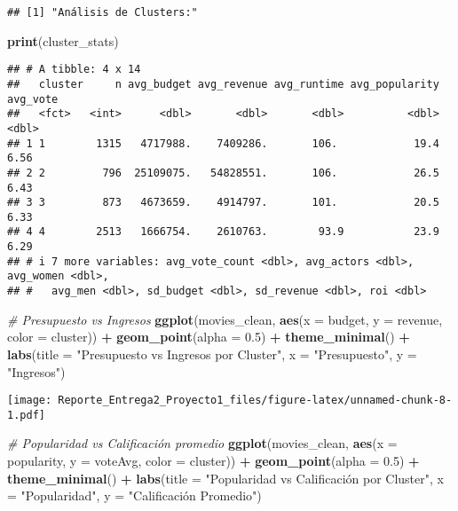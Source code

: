 \documentclass[
]{article}
\newenvironment{Shaded}{\begin{snugshade}}{\end{snugshade}}
\newcommand{\AttributeTok}[1]{\textcolor[rgb]{0.13,0.29,0.53}{#1}}
\newcommand{\CommentTok}[1]{\textcolor[rgb]{0.56,0.35,0.01}{\textit{#1}}}
\newcommand{\FloatTok}[1]{\textcolor[rgb]{0.00,0.00,0.81}{#1}}
\newcommand{\FunctionTok}[1]{\textcolor[rgb]{0.13,0.29,0.53}{\textbf{#1}}}
\newcommand{\NormalTok}[1]{#1}
\newcommand{\SpecialCharTok}[1]{\textcolor[rgb]{0.81,0.36,0.00}{\textbf{#1}}}
\newcommand{\StringTok}[1]{\textcolor[rgb]{0.31,0.60,0.02}{#1}}
\begin{document}
\begin{verbatim}
## [1] "Análisis de Clusters:"
\end{verbatim}

\begin{Shaded}
\begin{Highlighting}[]
\FunctionTok{print}\NormalTok{(cluster\_stats)}
\end{Highlighting}
\end{Shaded}

\begin{verbatim}
## # A tibble: 4 x 14
##   cluster     n avg_budget avg_revenue avg_runtime avg_popularity avg_vote
##   <fct>   <int>      <dbl>       <dbl>       <dbl>          <dbl>    <dbl>
## 1 1        1315   4717988.    7409286.       106.            19.4     6.56
## 2 2         796  25109075.   54828551.       106.            26.5     6.43
## 3 3         873   4673659.    4914797.       101.            20.5     6.33
## 4 4        2513   1666754.    2610763.        93.9           23.9     6.29
## # i 7 more variables: avg_vote_count <dbl>, avg_actors <dbl>, avg_women <dbl>,
## #   avg_men <dbl>, sd_budget <dbl>, sd_revenue <dbl>, roi <dbl>
\end{verbatim}

\begin{Shaded}
\begin{Highlighting}[]
\CommentTok{\# Presupuesto vs Ingresos}
\FunctionTok{ggplot}\NormalTok{(movies\_clean, }\FunctionTok{aes}\NormalTok{(}\AttributeTok{x =}\NormalTok{ budget, }\AttributeTok{y =}\NormalTok{ revenue, }\AttributeTok{color =}\NormalTok{ cluster)) }\SpecialCharTok{+}
  \FunctionTok{geom\_point}\NormalTok{(}\AttributeTok{alpha =} \FloatTok{0.5}\NormalTok{) }\SpecialCharTok{+}
  \FunctionTok{theme\_minimal}\NormalTok{() }\SpecialCharTok{+}
  \FunctionTok{labs}\NormalTok{(}\AttributeTok{title =} \StringTok{"Presupuesto vs Ingresos por Cluster"}\NormalTok{,}
       \AttributeTok{x =} \StringTok{"Presupuesto"}\NormalTok{,}
       \AttributeTok{y =} \StringTok{"Ingresos"}\NormalTok{)}
\end{Highlighting}
\end{Shaded}

\texttt{[image: Reporte\_Entrega2\_Proyecto1\_files/figure-latex/unnamed-chunk-8-1.pdf]}

\begin{Shaded}
\begin{Highlighting}[]
\CommentTok{\# Popularidad vs Calificación promedio}
\FunctionTok{ggplot}\NormalTok{(movies\_clean, }\FunctionTok{aes}\NormalTok{(}\AttributeTok{x =}\NormalTok{ popularity, }\AttributeTok{y =}\NormalTok{ voteAvg, }\AttributeTok{color =}\NormalTok{ cluster)) }\SpecialCharTok{+}
  \FunctionTok{geom\_point}\NormalTok{(}\AttributeTok{alpha =} \FloatTok{0.5}\NormalTok{) }\SpecialCharTok{+}
  \FunctionTok{theme\_minimal}\NormalTok{() }\SpecialCharTok{+}
  \FunctionTok{labs}\NormalTok{(}\AttributeTok{title =} \StringTok{"Popularidad vs Calificación por Cluster"}\NormalTok{,}
       \AttributeTok{x =} \StringTok{"Popularidad"}\NormalTok{,}
       \AttributeTok{y =} \StringTok{"Calificación Promedio"}\NormalTok{)}
\end{Highlighting}
\end{Shaded}
\end{document}
